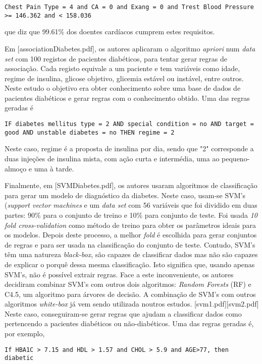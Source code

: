 \begin{lstlisting}
Chest Pain Type = 4 and CA = 0 and Exang = 0 and Trest Blood Pressure >= 146.362 and < 158.036
\end{lstlisting}
que diz que 99.61\% dos doentes cardíacos cumprem estes requisitos. 

Em [associationDiabetes.pdf], os autores aplicaram o algoritmo \textit{apriori} num \textit{data set} com 100 registos de pacientes diabéticos, para tentar gerar regras de associação. Cada registo equivale a um paciente e tem variáveis como idade, regime de insulina, glicose objetivo, glicemia estável ou instável, entre outros. 
Neste estudo o objetivo era obter conhecimento sobre uma base de dados de pacientes diabéticos e gerar regras com o conhecimento obtido.
Uma das regras geradas é 
\begin{lstlisting}
IF diabetes mellitus type = 2 AND special condition = no AND target = good AND unstable diabetes = no THEN regime = 2
\end{lstlisting}
Neste caso, regime é a proposta de insulina por dia, sendo que "2" corresponde a duas injeções de insulina mista, com ação curta e intermédia, uma ao pequeno-almoço e uma à tarde. 

Finalmente, em [SVMDiabetes.pdf], os autores usaram algoritmos de classificação para gerar um modelo de diagnóstico da diabetes. Neste caso, usam-se SVM's (\textit{support vector machines} e um \textit{data set} com 56 variáveis que foi dividido em duas partes: 90\% para o conjunto de treino e 10\% para conjunto de teste. Foi usada \textit{10 fold cross-validation} como método de treino para obter os parâmetros ideais para os modelos. Depois deste processo, a melhor \textit{fold} é escolhida para gerar conjuntos de regras e para ser usada na classificação do conjunto de teste. Contudo, SVM's têm uma natureza \textit{black-box}, são capazes de classificar dados mas não são capazes de explicar o porquê dessa mesma classificação. Isto significa que, usando apenas SVM's, não é possível extrair regras. Face a este inconveniente, os autores decidiram combinar SVM's com outros dois algoritmos: \textit{Random Forests} (RF) e C4.5, um algoritmo para árvores de decisão. A combinação de SVM's com outros algoritmos \textit{white-box} já vem sendo utilizada noutros estudos. [svm1.pdf][svm2.pdf] Neste caso, conseguiram-se gerar regras que ajudam a classificar dados como pertencendo a pacientes diabéticos ou não-diabéticos. Uma das regras geradas é, por exemplo, 
\begin{lstlisting}
If HBA1C > 7.15 and HDL > 1.57 and CHOL > 5.9 and AGE>77, then diabetic
\end{lstlisting}

